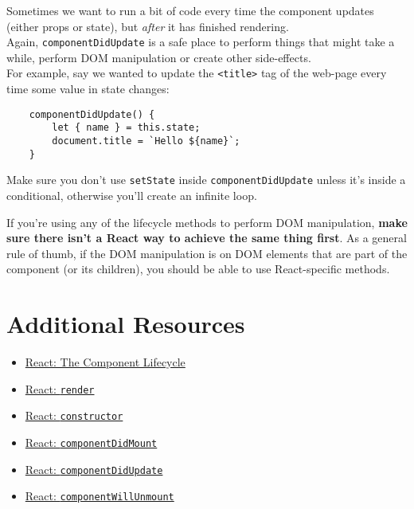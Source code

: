 Sometimes we want to run a bit of code every time the component updates (either props or state), but \textit{after} it has finished rendering.
\\

Again, \texttt{componentDidUpdate} is a safe place to perform things that might take a while, perform DOM manipulation or create other side-effects.
\\

For example, say we wanted to update the \texttt{<title>} tag of the web-page every time some value in state changes:

\begin{verbatim}
    componentDidUpdate() {
        let { name } = this.state;
        document.title = `Hello ${name}`;
    }
\end{verbatim}

Make sure you don't use \texttt{setState} inside \texttt{componentDidUpdate} unless it's inside a conditional, otherwise you'll create an infinite loop.

\hr

If you're  using any of the lifecycle methods to perform DOM manipulation, \textbf{make sure there isn't a React way to achieve the same thing first}. As a general rule of thumb, if the DOM manipulation is on DOM elements that are part of the component (or its children), you should be able to use React-specific methods.



\section{Additional Resources}

\begin{itemize}[leftmargin=*]
    \item \href{https://reactjs.org/docs/react-component.html#the-component-lifecycle}{React: The Component Lifecycle}
    \item \href{https://reactjs.org/docs/react-component.html#render}{React: \texttt{render}}
    \item \href{https://reactjs.org/docs/react-component.html#constructor}{React: \texttt{constructor}}
    \item \href{https://reactjs.org/docs/react-component.html#componentdidmount}{React: \texttt{componentDidMount}}
    \item \href{https://reactjs.org/docs/react-component.html#componentdidupdate}{React: \texttt{componentDidUpdate}}
    \item \href{https://reactjs.org/docs/react-component.html#componentwillunmount}{React: \texttt{componentWillUnmount}}
\end{itemize}
